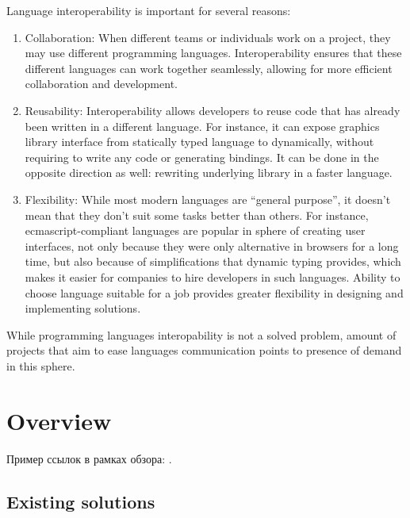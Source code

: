 \documentclass[times, %
               specification,annotation, %
               titlepage-extra-ru,specification-extra-ru,annotation-extra-ru, %
               languages={russian,english} %
              ]{itmo-student-thesis}
\begin{document}
\tableofcontents

\startprefacepage

Language interoperability is important for several reasons:

\begin{enumerate}
\item Collaboration: When different teams or individuals work on a project, they may use different programming languages. Interoperability ensures that these different languages can work together seamlessly, allowing for more efficient collaboration and development.

\item Reusability: Interoperability allows developers to reuse code that has already been written in a different language. For instance, it can expose graphics library interface from statically typed language to dynamically, without requiring to write any code or generating bindings. It can be done in the opposite direction as well: rewriting underlying library in a faster language.

\item Flexibility: While most modern languages are ``general purpose'', it doesn't mean that they don't suit some tasks better than others. For instance, ecmascript-compliant languages are popular in sphere of creating user interfaces, not only because they were only alternative in browsers for a long time, but also because of simplifications that dynamic typing provides, which makes it easier for companies to hire developers in such languages. Ability to choose language suitable for a job provides greater flexibility in designing and implementing solutions.
\end{enumerate}

While programming languages interopability is not a solved problem, amount of projects that aim to ease languages communication points to presence of demand in this sphere.

\chapter{Overview}

\startrelatedwork
Пример ссылок в рамках обзора: \cite{example-english, example-russian, unrestricted-jump-evco, doerr-doerr-lambda-lambda-self-adjustment-arxiv}.

\section{Existing solutions}
\end{document}
